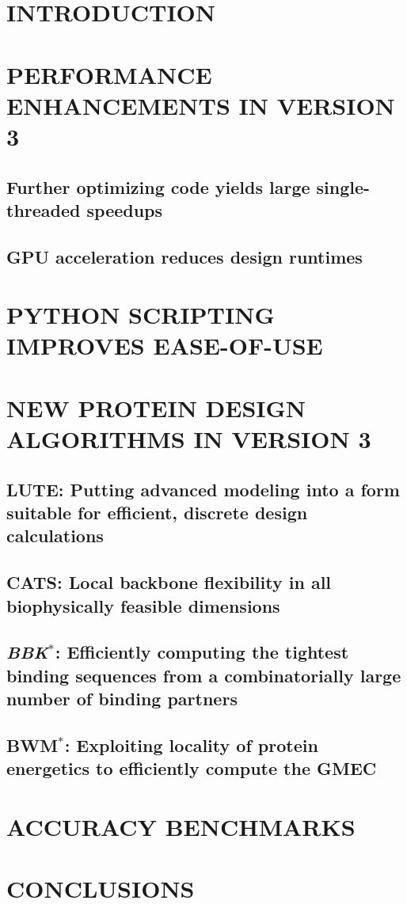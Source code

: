 \documentclass[12pt]{article}
\def\bwmstar{BWM$^*$}
\def\bbks{\textit{BBK$^*$}\xspace}
\newcommand{\jccsubsection}[1]{\subsection*{\sffamily \large #1}}
\begin{document}
  \makeatletter
  \renewcommand\@biblabel[1]{#1.}
  \makeatother



\renewcommand{\baselinestretch}{1.5}
\normalsize


\clearpage


\section*{\sffamily \Large INTRODUCTION} 


\section*{\sffamily \Large PERFORMANCE ENHANCEMENTS IN VERSION 3}
\jccsubsection{Further optimizing code yields large single-threaded speedups}

\jccsubsection{GPU acceleration reduces design runtimes}


\section*{\sffamily \Large PYTHON SCRIPTING IMPROVES EASE-OF-USE}



\section*{\sffamily \Large NEW PROTEIN DESIGN ALGORITHMS IN VERSION 3}
\jccsubsection{LUTE: Putting advanced modeling into a form suitable for efficient, discrete design calculations}

\jccsubsection{CATS: Local backbone flexibility in all biophysically feasible dimensions}

\jccsubsection{\bbks: Efficiently computing the tightest binding sequences from a combinatorially large number of binding partners}

\jccsubsection{\bwmstar: Exploiting locality of protein energetics to efficiently compute the GMEC}


\section*{\sffamily \Large ACCURACY BENCHMARKS}


\section*{\sffamily \Large CONCLUSIONS}

\end{document}
